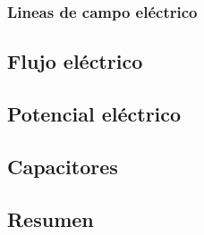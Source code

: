 

\subsubsection{Lineas de campo eléctrico}



\subsection{Flujo eléctrico}



\subsection{Potencial eléctrico}



\subsection{Capacitores}



\subsection{Resumen}

